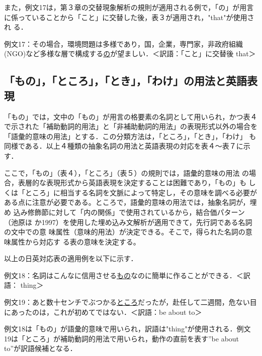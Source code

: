 また，例文17は，第３章の交替現象解析の規則が適用される例で，「の」が用言
に係っていることから「こと」に交替した後，表３が適用され，"that"が使用され
る．

\vspace{6pt}

例文17：その場合，環境問題は多様であり，国，企業，専門家，非政府組織
(NGO)など多様な層で構成する\underline{の}が望ましい．＜訳語：「こと」に交替後 that＞

\subsection{「もの」，「ところ」，「とき」，「わけ」の用法と英語表現}

「もの」では，文中の「もの」が用言の格要素の名詞として用いられ，かつ表４
で示された「補助動詞的用法」と「非補助動詞的用法」の表現形式以外の場合を
「語彙的意味の用法」とする．この分類方法は，「ところ」，「とき」，「わけ」
も同様である．以上４種類の抽象名詞の用法と英語表現の対応を表４〜表７に示す．

ここで，「もの」（表４），「ところ」（表５）の規則では，語彙的意味の用法
の場合，表層的な表現形式から英語表現を決定することは困難であり，「もの」も
しくは「ところ」に相当する名詞を文脈によって特定し，その意味を調べる必要が
ある点に注意が必要である。ところで，語彙的意味の用法では，抽象名詞が，埋め
込み修飾節に対して「内の関係」で使用されているから，結合価パターン（池原ほ
か1997）を使用した埋め込み文解析が適用できて，先行詞である名詞の文中での意
味属性（意味的用法）が決定できる。そこで，得られた名詞の意味属性から対応す
る表の意味を決定する。

以上の日英対応表の適用例を以下に示す．

\vspace{6pt}

例文18：名詞はこんなに信用させる\underline{もの}なのに簡単に作ることができる．＜訳語：
thing＞

例文19：あと数十センチでぶつかる\underline{ところ}だったが，赴任して二週間，危ない目
にあったのは，これが初めてではない．＜訳語：be about to＞

\vspace{6pt}

例文18は「もの」が語彙的意味で用いられ，訳語は"thing"が使用される．例文
19は「ところ」が補助動詞的用法で用いられ，動作の直前を表す''be about
to''が訳語候補となる．

